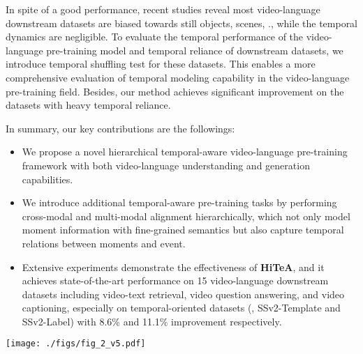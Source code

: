 \documentclass[10pt,twocolumn,letterpaper]{article}
\newcommand{\modelname}{\textbf{HiTeA}\xspace}
\begin{document}
In spite of a good performance, recent studies \cite{lei2022singularity, buch2022atp} reveal most video-language downstream datasets are biased towards still objects, scenes, \etc., while the temporal dynamics are negligible. To evaluate the temporal performance of the video-language pre-training model and temporal reliance of downstream datasets, we introduce temporal shuffling test for these datasets. This enables a more comprehensive evaluation of temporal modeling capability in the video-language pre-training field. Besides, our method achieves significant improvement on the datasets with heavy temporal reliance.

In summary, our key contributions are the followings:
\begin{itemize}\setlength{\itemsep}{-1pt}
\item We propose a novel hierarchical temporal-aware video-language pre-training framework with both video-language understanding and generation capabilities.
\item We introduce additional temporal-aware pre-training tasks by performing cross-modal and multi-modal alignment hierarchically, which not only model moment information with fine-grained semantics but also capture temporal relations between moments and event.
\item Extensive experiments demonstrate the effectiveness of \modelname, and it achieves state-of-the-art performance on 15 video-language downstream datasets including video-text retrieval, video question answering, and video captioning, especially on temporal-oriented datasets (\eg, SSv2-Template and SSv2-Label) with 8.6\% and 11.1\% improvement respectively.
\end{itemize}

\begin{figure*}
    \centering
    \texttt{[image: ./figs/fig\_2\_v5.pdf]}
    \caption{Illustration of the proposed \modelname. We first generate two different temporal views for the input video, where the long-view is the video itself and the short-view is randomly truncated from the input video. To explore the moment revealed in the short-view, \textit{cross-modal moment exploration} (CME) selects the candidate words from the input text with . Then, we perform \textit{multi-modal temporal relation exploration} (MTRE) for modeling the temporal relations between two video-text pairs with different views by . Note that the multi-modal encoders and the text features are shared.}
    \vspace{-3ex}
\label{fig:2}
\end{figure*}
\end{document}
